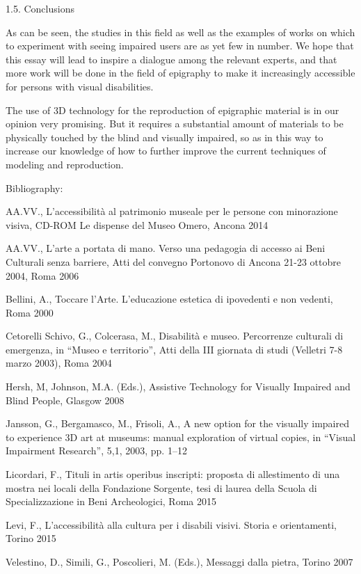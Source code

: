 \documentclass[amsthm,ebook]{saparticle}
\begin{document}
\bigskip


\bigskip

1.5. Conclusions


\bigskip

As can be seen, the studies in this field as well as the examples of works on which to experiment with seeing impaired
users are as yet few in number. We hope that this essay will lead to inspire a dialogue among the relevant experts, and
that more work will be done in the field of epigraphy to make it increasingly accessible for persons with visual
disabilities.

The use of 3D technology for the reproduction of epigraphic material is in our opinion very promising. But it requires a
substantial amount of materials to be physically touched by the blind and visually impaired, so as in this way to
increase our knowledge of how to further improve the current techniques of modeling and reproduction.


\bigskip

Bibliography:


\bigskip

AA.VV., L’accessibilità al patrimonio museale per le persone con minorazione visiva, CD-ROM Le dispense del Museo Omero,
Ancona 2014

AA.VV., L’arte a portata di mano. Verso una pedagogia di accesso ai Beni Culturali senza barriere, Atti del convegno
Portonovo di Ancona 21-23 ottobre 2004, Roma 2006

Bellini, A., Toccare l’Arte. L’educazione estetica di ipovedenti e non vedenti, Roma 2000

Cetorelli Schivo, G., Colcerasa, M., Disabilità e museo. Percorrenze culturali di emergenza, in “Museo e territorio”,
Atti della III giornata di studi (Velletri 7-8 marzo 2003), Roma 2004

Hersh, M, Johnson, M.A. (Eds.), Assistive Technology for Visually Impaired and Blind People, Glasgow 2008

Jansson, G., Bergamasco, M., Frisoli, A., A new option for the visually impaired to experience 3D art at museums: manual
exploration of virtual copies, in “Visual Impairment Research”, 5,1, 2003, pp. 1–12

Licordari, F., Tituli in artis operibus inscripti: proposta di allestimento di una mostra nei locali della Fondazione
Sorgente, tesi di laurea della Scuola di Specializzazione in Beni Archeologici, Roma 2015

Levi, F., L’accessibilità alla cultura per i disabili visivi. Storia e orientamenti, Torino 2015

Velestino, D., Simili, G., Poscolieri, M. (Eds.), Messaggi dalla pietra, Torino 2007


\end{document}
